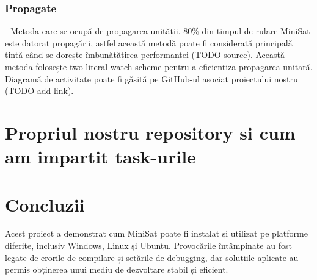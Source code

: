 \documentclass{llncs}
\begin{document}
\subsubsection{Propagate} - Metoda care se ocupă de propagarea unității. 80\% din timpul de rulare MiniSat este datorat propagării, astfel această metodă poate fi considerată principală țintă când se dorește îmbunătățirea performanței (TODO source). Această metoda folosește two-literal watch scheme pentru a eficientiza propagarea unitară. Diagramă de activitate poate fi găsită pe GitHub-ul asociat proiectului nostru (TODO add link).


\section{Propriul nostru repository si cum am impartit task-urile}

\section{Concluzii}

Acest proiect a demonstrat cum MiniSat poate fi instalat și utilizat pe platforme diferite, inclusiv Windows, Linux și Ubuntu. Provocările întâmpinate au fost legate de erorile de compilare și setările de debugging, dar soluțiile aplicate au permis obținerea unui mediu de dezvoltare stabil și eficient.
\end{document}
